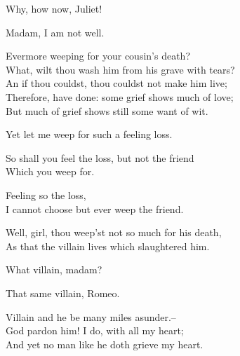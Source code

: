 \begin{speech}
Why, how now, Juliet! \\
\end{speech}
\begin{speech}
Madam, I am not well. \\
\end{speech}
\begin{speech}
Evermore weeping for your cousin's death? \\
What, wilt thou wash him from his grave with tears? \\
An if thou couldst, thou couldst not make him live; \\
Therefore, have done: some grief shows much of love; \\
But much of grief shows still some want of wit. \\
\end{speech}
\begin{speech}
Yet let me weep for such a feeling loss. \\
\end{speech}
\begin{speech}
So shall you feel the loss, but not the friend
\\
Which you weep for. \\
\end{speech}
\begin{speech}
Feeling so the loss, \\
I cannot choose but ever weep the friend. \\
\end{speech}
\begin{speech}
Well, girl, thou weep'st not so much for his death,
\\
As that the villain lives which slaughtered him. \\
\end{speech}
\begin{speech}
What villain, madam? \\
\end{speech}
\begin{speech}
That same villain, Romeo. \\
\end{speech}
\begin{speech}
 Villain and he be many miles asunder.--
\\
God pardon him! I do, with all my heart; \\
And yet no man like he doth grieve my heart. \\
\end{speech}
